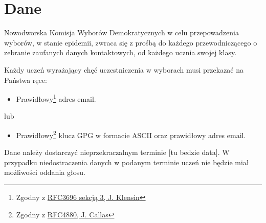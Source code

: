 \section{Dane}


Nowodworska Komisja Wyborów Demokratycznych w celu przepowadzenia wyborów, w stanie epidemii, zwraca się z prośbą do każdego przewodniczącego o zebranie zaufanych danych kontaktowych, od każdego ucznia swojej klasy. \\

\par Każdy uczeń wyrażający chęć uczestniczenia w wyborach musi przekazać na Państwa ręce:

\begin{itemize}
  \item Prawidłowy\footnote{Zgodny z \href{https://tools.ietf.org/html/rfc3696}{RFC3696 sekcją 3, J. Klensin}} adres email.
\end{itemize}

\vspace{-0.3cm}
\hspace{1cm} lub
\vspace{-0.3cm}

\begin{itemize}
  \item Prawidłowy\footnote{Zgodny z \href{https://tools.ietf.org/html/rfc4880}{RFC4880, J. Callas}} klucz GPG w formacie ASCII oraz prawidłowy adres email.
\end{itemize}
\vspace{0.3cm} %
Dane należy dostarczyć nieprzekraczalnym terminie [tu bedzie data]. W przypadku niedostraczenia danych w podanym terminie uczeń nie będzie miał możliwości oddania głosu.

